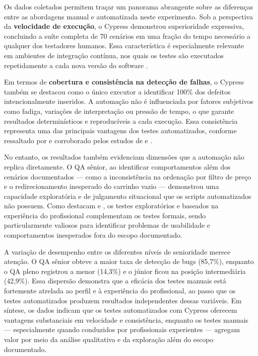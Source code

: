 \documentclass{UNESC}
\begin{document}
Os dados coletados permitem traçar um panorama abrangente sobre as diferenças entre as abordagens manual e automatizada neste experimento. Sob a perspectiva da \textbf{velocidade de execução}, o Cypress demonstrou superioridade expressiva, concluindo a suíte completa de 70 cenários em uma fração do tempo necessário a qualquer dos testadores humanos. Essa característica é especialmente relevante em ambientes de integração contínua, nos quais os testes são executados repetidamente a cada nova versão do software \cite{matos2020esus}.

Em termos de \textbf{cobertura e consistência na detecção de falhas}, o Cypress também se destacou como o único executor a identificar 100\% dos defeitos intencionalmente inseridos. A automação não é influenciada por fatores subjetivos como fadiga, variações de interpretação ou pressão de tempo, o que garante resultados determinísticos e reproducíveis a cada execução. Essa consistência representa uma das principais vantagens dos testes automatizados, conforme ressaltado por  e corroborado pelos estudos de  e .

No entanto, os resultados também evidenciam dimensões que a automação não replica diretamente. O QA sênior, ao identificar comportamentos além dos cenários documentados — como a inconsistência na ordenação por filtro de preço e o redirecionamento inesperado do carrinho vazio — demonstrou uma capacidade exploratória e de julgamento situacional que os scripts automatizados não possuem. Como destacam  e , os testes exploratórios e baseados na experiência do profissional complementam os testes formais, sendo particularmente valiosos para identificar problemas de usabilidade e comportamentos inesperados fora do escopo documentado.

A variação de desempenho entre os diferentes níveis de senioridade merece atenção. O QA sênior obteve a maior taxa de detecção de bugs (85,7\%), enquanto o QA pleno registrou a menor (14,3\%) e o júnior ficou na posição intermediária (42,9\%). Essa dispersão demonstra que a eficácia dos testes manuais está fortemente atrelada ao perfil e à experiência do profissional, ao passo que os testes automatizados produzem resultados independentes dessas variáveis. Em síntese, os dados indicam que os testes automatizados com Cypress oferecem vantagens substanciais em velocidade e consistência, enquanto os testes manuais — especialmente quando conduzidos por profissionais experientes — agregam valor por meio da análise qualitativa e da exploração além do escopo documentado.
\end{document}
